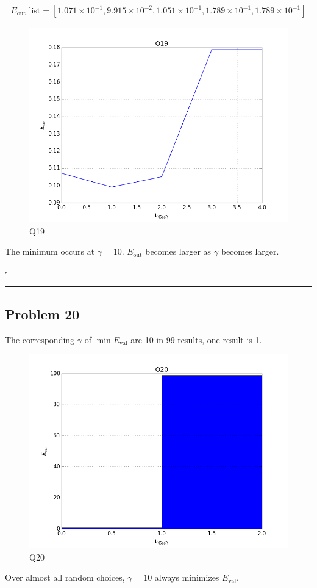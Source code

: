 \documentclass[12pt]{article}
\newcommand*{\QEDB}{\hfill\ensuremath{\square}}
\newcommand{\SBrackets}[1]{\left[#1\right]}
\newcommand{\SciNum}[2]{#1\times{10}^{#2}}
\newcommand{\horrule}[1]{\rule{\linewidth}{#1}}
\begin{document}
\begin{align}
E_{\text{out}}\text{ list}=\SBrackets{\SciNum{1.071}{-1}, \SciNum{9.915}{-2}, \SciNum{1.051}{-1}, \SciNum{1.789}{-1}, \SciNum{1.789}{-1}}
\end{align}
\begin{figure}[H]
	\centering
	\includegraphics[scale=0.5]{Q19.png}
	\caption{Q19}
	\label{Q19}
\end{figure}
The minimum occurs at $\gamma=10$. $E_{\text{out}}$ becomes larger as $\gamma$ becomes larger.

\QEDB

\horrule{0.5pt}

\subsection*{Problem 20}

The corresponding $\gamma$ of $\min E_{\text{val}}$ are 10 in 99 results, one result is 1.
\begin{figure}[H]
	\centering
	\includegraphics[scale=0.5]{Q20.png}
	\caption{Q20}
	\label{Q20}
\end{figure}
Over almost all random choices, $\gamma=10$ always minimizes $E_{\text{val}}$.
\end{document}

